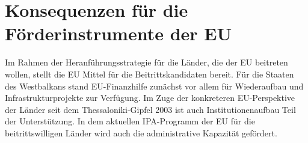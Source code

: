 \section{Konsequenzen für die Förderinstrumente der EU}
Im Rahmen der Heranführungsstrategie für die Länder, die der EU beitreten wollen, stellt die EU Mittel für die Beitrittskandidaten bereit. Für die Staaten des Westbalkans stand EU-Finanzhilfe zunächst vor allem für Wiederaufbau und Infrastrukturprojekte zur Verfügung. Im Zuge der konkreteren EU-Perspektive der Länder seit dem Thessaloniki-Gipfel 2003 ist auch Institutionenaufbau Teil der Unterstützung. In dem aktuellen IPA-Programm der EU für die beitrittswilligen Länder wird auch die administrative Kapazität gefördert.\par
